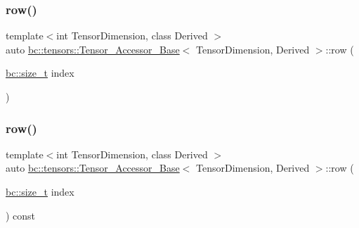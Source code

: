 \mbox{\label{classbc_1_1tensors_1_1Tensor__Accessor__Base_a656a59f5685cec6c053db095a510ddb3}} 
\subsubsection{\texorpdfstring{row()}{row()}\hspace{0.1cm}{\footnotesize\ttfamily [1/2]}}
{\footnotesize\ttfamily template$<$int Tensor\+Dimension, class Derived $>$ \\
auto \hyperlink{classbc_1_1tensors_1_1Tensor__Accessor__Base}{bc\+::tensors\+::\+Tensor\+\_\+\+Accessor\+\_\+\+Base}$<$ Tensor\+Dimension, Derived $>$\+::row (\begin{DoxyParamCaption}\item[{\hyperlink{namespacebc_aaf8e3fbf99b04b1b57c4f80c6f55d3c5}{bc\+::size\+\_\+t}}]{index }\end{DoxyParamCaption})\hspace{0.3cm}{\ttfamily [inline]}}

\mbox{\label{classbc_1_1tensors_1_1Tensor__Accessor__Base_a31baf21f8e0ee8dd55d5e1e9a9a91cc1}} 
\subsubsection{\texorpdfstring{row()}{row()}\hspace{0.1cm}{\footnotesize\ttfamily [2/2]}}
{\footnotesize\ttfamily template$<$int Tensor\+Dimension, class Derived $>$ \\
auto \hyperlink{classbc_1_1tensors_1_1Tensor__Accessor__Base}{bc\+::tensors\+::\+Tensor\+\_\+\+Accessor\+\_\+\+Base}$<$ Tensor\+Dimension, Derived $>$\+::row (\begin{DoxyParamCaption}\item[{\hyperlink{namespacebc_aaf8e3fbf99b04b1b57c4f80c6f55d3c5}{bc\+::size\+\_\+t}}]{index }\end{DoxyParamCaption}) const\hspace{0.3cm}{\ttfamily [inline]}}

